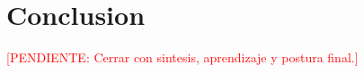 \documentclass[
	spanish,
	letterpaper, oneside
]{article}
\newcommand{\pendiente}[1]{\textcolor{red}{[PENDIENTE: #1]}}
\begin{document}
\section{Conclusion}

\pendiente{Cerrar con sintesis, aprendizaje y postura final.}




\end{document}
